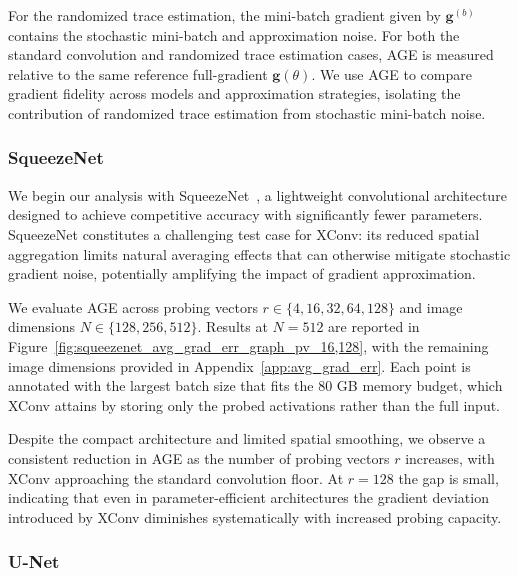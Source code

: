 \documentclass[10pt]{article}
\begin{document}
For the randomized trace estimation, the mini-batch gradient given by $\mathbf{g}^{(b)}$ contains the stochastic mini-batch and approximation noise. For both the standard convolution and randomized trace estimation cases, AGE is measured relative to the same reference full-gradient $\mathbf{g}(\theta)$. We use AGE to compare gradient fidelity across models and approximation strategies, isolating the contribution of randomized trace estimation from stochastic mini-batch noise.

\subsubsection{SqueezeNet}
\label{subsubsec:age_squeezenet}

We begin our analysis with SqueezeNet~\citep{squeeznet}, a lightweight convolutional architecture designed to achieve competitive accuracy with significantly fewer parameters. SqueezeNet constitutes a challenging test case for XConv: its reduced spatial aggregation limits natural averaging effects that can otherwise mitigate stochastic gradient noise, potentially amplifying the impact of gradient approximation. 

We evaluate AGE across probing vectors $r \in \{4, 16, 32, 64, 128\}$ and image dimensions $N \in \{128, 256, 512\}$. Results at $N = 512$ are reported in Figure~\ref{fig:squeezenet_avg_grad_err_graph_pv_16,128}, with the remaining image dimensions provided in Appendix~\ref{app:avg_grad_err}. Each point is annotated with the largest batch size that fits the $80$ GB memory budget, which XConv attains by storing only the probed activations rather than the full input.

Despite the compact architecture and limited spatial smoothing, we observe a consistent reduction in AGE as the number of probing vectors $r$ increases, with XConv approaching the standard convolution floor. At $r = 128$ the gap is small, indicating that even in parameter-efficient architectures the gradient deviation introduced by XConv diminishes systematically with increased probing capacity.


\subsubsection{U-Net}
\label{subsubsec:age_unet}
\end{document}
